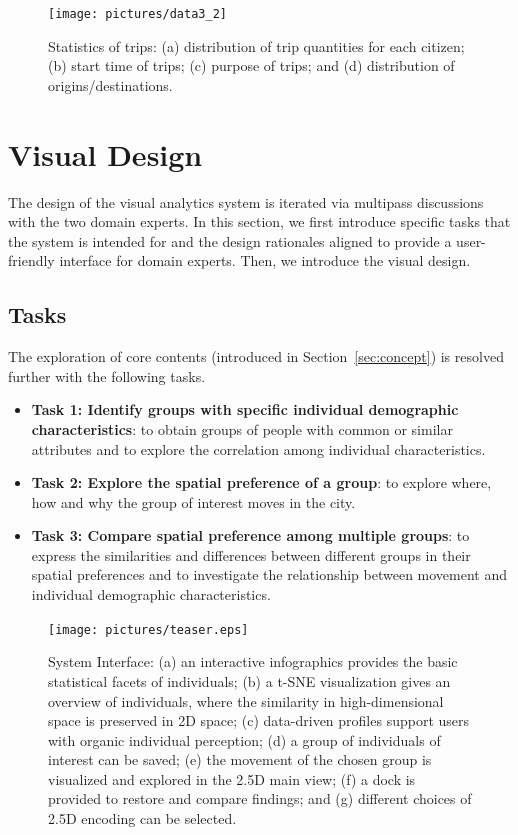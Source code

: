 \documentclass{ieeeaccess}
\begin{document}
\begin{figure}[htb!]
 \centering %
 \texttt{[image: pictures/data3\_2]}
 \caption{Statistics of trips: (a) distribution of trip quantities for each citizen; (b) start time of trips; (c) purpose of trips; and (d) distribution of origins/destinations. }
 \label{fig:data_geometry}
\end{figure}



\section{Visual Design}

The design of the visual analytics system is iterated via multipass discussions with the two domain experts. In this section, we first introduce specific tasks that the system is intended for and the design rationales aligned to provide a user-friendly interface for domain experts. Then, we introduce the visual design.

\subsection{Tasks}

The exploration of core contents (introduced in Section~\ref{sec:concept}) is resolved further with the following tasks.

\begin{itemize}
\item \textbf{Task 1: Identify groups with specific individual demographic characteristics}: to obtain groups of people with common or similar attributes and to explore the correlation among individual characteristics.
\item \textbf{Task 2: Explore the spatial preference of a group}: to explore where, how and why the group of interest moves in the city.
\item \textbf{Task 3: Compare spatial preference among multiple groups}: to express the similarities and differences between different groups in their spatial preferences and to investigate the relationship between movement and individual demographic characteristics.
\end{itemize}

\begin{figure}[htb!]
 \centering
 \texttt{[image: pictures/teaser.eps]}
 \caption{System Interface: (a) an interactive infographics provides the basic statistical facets of individuals; (b) a t-SNE visualization gives an overview of individuals, where the similarity in high-dimensional space is preserved in 2D space; (c) data-driven profiles support users with organic individual perception; (d) a group of individuals of interest can be saved; (e) the movement of the chosen group is visualized and explored in the 2.5D main view; (f) a dock is provided to restore and compare findings; and (g) different choices of 2.5D encoding can be selected.}
 \label{fig:teaser}
\end{figure}
\end{document}
